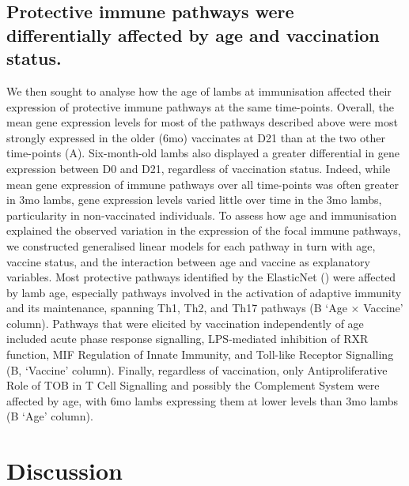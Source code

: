 \documentclass[a4paper, hidelinks, 11pt]{article}
\begin{document}

\subsection{Protective immune pathways were differentially affected by age
and vaccination status.}

We then sought to analyse how the age of lambs at immunisation affected their
expression of protective immune pathways at the same time-points. Overall, the
mean gene expression levels for most of the pathways described above were most
strongly expressed in the older (6mo) vaccinates at D21 than at the two other
time-points (A). Six-month-old lambs also
displayed a greater differential in gene expression between D0 and D21,
regardless of vaccination status. Indeed, while mean gene expression of immune
pathways over all time-points was often greater in 3mo lambs, gene expression
levels varied little over time in the 3mo lambs, particularity in
non-vaccinated individuals. To assess how age and immunisation explained the
observed variation in the expression of the focal immune pathways, we
constructed generalised linear models for each pathway in turn with age,
vaccine status, and the interaction between age and vaccine as explanatory
variables. Most protective pathways identified by the ElasticNet
() were affected by lamb age, especially pathways
involved in the activation of adaptive immunity and its maintenance, spanning
Th1, Th2, and Th17 pathways (B `Age ×
Vaccine' column). Pathways that were elicited by vaccination independently of
age included acute phase response signalling, LPS-mediated inhibition of RXR
function, MIF Regulation of Innate Immunity, and Toll-like Receptor Signalling
(B, `Vaccine' column). Finally, regardless
of vaccination, only Antiproliferative Role of TOB in T Cell Signalling and
possibly the Complement System were affected by age, with 6mo lambs expressing
them at lower levels than 3mo lambs (B
`Age' column).


\section{Discussion}
\end{document}
